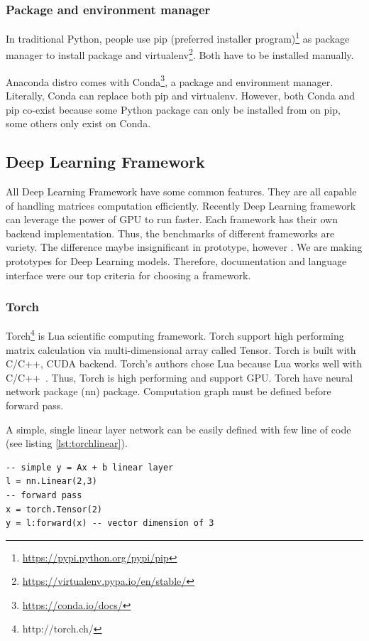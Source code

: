 \subsubsection{Package and environment manager}
In traditional Python, people use pip (preferred installer program)\footnote{\url{https://pypi.python.org/pypi/pip}} as package manager to install package and virtualenv\footnote{\url{https://virtualenv.pypa.io/en/stable/}}. Both have to be installed manually.

Anaconda distro comes with Conda\footnote{\url{https://conda.io/docs/}}, a package and environment manager.
Literally, Conda can replace both pip and virtualenv.
However, both Conda and pip co-exist because some Python package can only be installed from on pip, some others only exist on Conda.


\subsection{Deep Learning Framework}
All Deep Learning Framework have some common features.
They are all capable of handling matrices computation efficiently.
Recently Deep Learning framework can leverage the power of GPU to run faster.
Each framework has their own backend implementation.
Thus, the benchmarks of different frameworks are variety.
The difference maybe insignificant in prototype, however .
We are making prototypes for Deep Learning models.
Therefore, documentation and language interface were our top criteria for choosing a framework.

\subsubsection{Torch}\label{sec:torch}
Torch\footnote{http://torch.ch/} is Lua scientific computing framework.
Torch support high performing matrix calculation via multi-dimensional array called Tensor. Torch is built with C/C++, CUDA backend.
Torch's authors chose Lua because Lua works well with C/C++~\cite{collobert2011torch7}.  Thus, Torch is high performing and support GPU. Torch have neural network package (nn) package. Computation graph must be defined before forward pass.

A simple, single linear layer network can be easily defined with few line of code (see listing \ref{lst:torchlinear}).

\begin{lstlisting}[caption={Simple linear layer in Torch},label={lst:torchlinear}, language={[5.1]Lua}]
-- simple y = Ax + b linear layer
l = nn.Linear(2,3)
-- forward pass
x = torch.Tensor(2)
y = l:forward(x) -- vector dimension of 3
\end{lstlisting}

